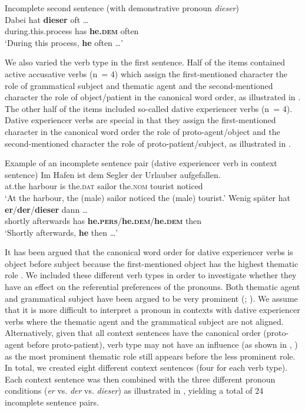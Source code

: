 \documentclass[output=paper,colorlinks,citecolor=brown]{langscibook}
\begin{document}
\ex\label{ex:fuchs:2d}  Incomplete second sentence (with demonstrative pronoun \textit{dieser})\\
\gll Dabei hat \textbf{dieser} oft …\\
     during.this.process has \textbf{he\textsc{.dem}} often\\
\glt ‘During this process, \textbf{he} often …’
\z
\z


We also varied the verb type in the first sentence. Half of the items contained active accusative verbs (n~= 4) which assign the first-mentioned character the role of grammatical subject and thematic agent and the second-mentioned character the role of object/patient in the canonical word order, as illustrated in . The other half of the items included so-called dative experiencer verbs (n~= 4). Dative experiencer verbs are special in that they assign the first-mentioned character in the canonical word order the role of proto-agent/object and the second-mentioned character the role of proto-patient/subject, as illustrated in .

\ea\label{ex:fuchs:3} {Example of an incomplete sentence pair (dative experiencer verb in context sentence)}
\ea\label{ex:fuchs:3a}
\gll Im Hafen ist dem Segler der Urlauber aufgefallen.\\
     at.the harbour is the.\textsc{dat} sailor the\textsc{.nom} tourist noticed\\
\glt ‘At the harbour, the (male) sailor noticed the (male) tourist.’
\ex\label{ex:fuchs:3b}
\gll Wenig später hat \textbf{er}/\textbf{der}/\textbf{dieser} dann …\\
     shortly afterwards has \textbf{he.\textsc{pers}}/\textbf{he.\textsc{dem}}/\textbf{he\textsc{.dem}} then\\
\glt ‘Shortly afterwards, \textbf{he} then …’
\z
\z

It has been argued that the canonical word order for dative experiencer verbs is object before subject because the first-mentioned object has the highest thematic role \citep{Haider1993}. We included these different verb types in order to investigate whether they have an effect on the referential preferences of the pronouns. Both thematic agent and grammatical subject have been argued to be very prominent (\citealt{BoschEtAl2003}; \citealt{SchumacherEtAl2016}). We assume that it is more difficult to interpret a pronoun in contexts with dative experiencer verbs where the thematic agent and the grammatical subject are not aligned. Alternatively, given that all context sentences have the canonical order (proto-agent before proto-patient), verb type may not have an influence (as shown in \citealt{SchumacherEtAl2015}, \citeyear{SchumacherEtAl2016}) as the most prominent thematic role still appears before the less prominent role. In total, we created eight different context sentences (four for each verb type). Each context sentence was then combined with the three different pronoun conditions (\textit{er} vs. \textit{der} vs. \textit{dieser}) as illustrated in , yielding a total of 24 incomplete sentence pairs. 
\end{document}
